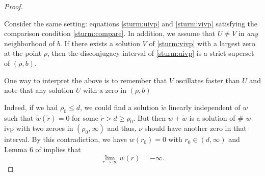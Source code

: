 \begin{proof}
\begin{emph}
    Consider the same setting: equations \eqref{sturm:uivp} and
    \eqref{sturm:vivp} satisfying the comparison condition
    \eqref{sturm:compare}. In addition, we assume that $U \neq V$ in \emph{any}
    neighborhood of $b$. If there exists a solution $V$ of \eqref{sturm:vivp}
    with a largest zero at the point $\rho$, then the disconjugacy interval of
    \eqref{sturm:uivp} is a strict superset of $(\rho, b)$. 

    One way to interpret the above is to remember that $V$ oscillates faster
    than $U$ and note that any solution $U$ with a zero in $(\rho, b)$ 
\end{emph}

Indeed, if we had $\rho_0 \leq d$, we could find a solution $\tilde{w}$ linearly
independent of $w$ such that $\tilde{w}(\tilde{r}) = 0$ for some $\tilde{r} > d
\geq \rho_0$. But then $w + \tilde{w}$ is a solution of \# $w$ ivp with two
zeroes in $(\rho_0, \infty)$ and thus, $\nu$ should have another zero in {\red that
interval}. By this contradiction, we have $w(r_0) = 0$ with $r_0 \in (d,
\infty)$ and Lemma 6 of \cite[p.~249]{kwong} implies that
\[ \underset{r\to\infty}{\lim} w(r) = -\infty. \]



\end{proof}
